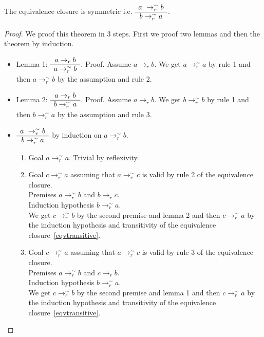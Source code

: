\begin{theorem}
  The equivalence closure is symmetric i.e. $\ruleh {a \to_r^\sim b} {b
    \to_r^\sim a}$.
  \begin{proof}
    We proof this theorem in 3 steps. First we proof two lemmas and then the
    theorem by induction.
    \begin{itemize}
    \item Lemma 1: $\begin{array}{c} a \to_r b \\ \hline a \to_r^\sim b\end{array}$. Proof. Assume $a \to_r
      b$. We get $a \to_r^\sim a$ by rule 1 and then $a \to_r^\sim b$ by the
      assumption and rule 2.
    \item
      Lemma 2: $\begin{array}{c} a \to_r b \\ \hline b \to_r^\sim a\end{array}$. Proof. Assume $a \to_r b$.
      We get $b \to_r^\sim b$ by rule 1 and then $b \to_r^\sim a$ by the
      assumption and rule 3.
    \item
      $\ruleh {a \to_r^\sim b} {b \to_r^\sim a}$ by induction on
      $a \to_r^\sim b$.
      \begin{enumerate}
      \item
        Goal $a \to_r^\sim a$. Trivial by reflexivity.

      \item
        Goal $c \to_r^\sim a$ assuming that $a \to_r^\sim c$ is valid by rule 2 of
        the equivalence closure.\\
        Premises $a\to_r^\sim b$ and $b \to_r c$.\\
        Induction hypothesis $b \to_r^\sim a$.\\
        We get $c \to_r^\sim b$ by the second premise and lemma 2 and then $c
        \to_r^\sim a$ by the induction hypothesis and transitivity of the
        equivalence closure~\ref{eqvtransitive}.

      \item
        Goal $c \to_r^\sim a$ assuming that $a \to_r^\sim c$ is valid by rule 3 of
        the equivalence closure.\\
        Premises $a\to_r^\sim b$ and $c \to_r b$.\\
        Induction hypothesis $b \to_r^\sim a$.\\
        We get $c \to_r^\sim b$ by the second premise and lemma 1 and then $c
        \to_r^\sim a$ by the induction hypothesis and transitivity of the
        equivalence closure~\ref{eqvtransitive}.

      \end{enumerate}
    \end{itemize}
  \end{proof}
\end{theorem}



